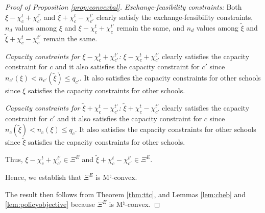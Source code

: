 \documentclass[12pt]{amsart}
\theoremstyle{remark}
\begin{document}
\begin{proof}[Proof of Proposition \ref{prop:convexbal}]
\smallskip
\noindent \emph{Exchange-feasibility constraints:} Both $\xi-\chi_c^t+\chi_{c'}^{t'}$ and $\tilde{\xi}+\chi_c^t-\chi_{c'}^{t'}$ clearly satisfy the exchange-feasibility constraints, $n_d$ values among $\xi$ and $\xi-\chi_c^t+\chi_{c}^{t'}$ remain the same, and $n_d$ values among $\tilde \xi$ and $\tilde{\xi}+\chi_c^t-\chi_{c}^{t'}$ remain the same.

\smallskip
\noindent \emph{Capacity constraints for $\xi-\chi_c^t+\chi_{c'}^{t'}$:} $\xi-\chi_c^t+\chi_{c'}^{t'}$ clearly satisfies the capacity constraint for $c$ and it also satisfies the capacity constraint for $c'$ since $n_{c'}(\xi) < n_{c'}(\tilde \xi) \leq q_{c'}$.  It also satisfies the capacity constraints for other schools since $\xi$ satisfies the capacity constraints for other schools.

\smallskip
\noindent \emph{Capacity constraints for $\tilde{\xi}+\chi_c^t-\chi_{c'}^{t'}$:} $\tilde{\xi}+\chi_c^t-\chi_{c'}^{t'}$ clearly satisfies the capacity constraint for $c'$
and it also satisfies the capacity constraint for $c$ since  $n_c(\tilde \xi) < n_c(\xi) \leq q_c$.  It also satisfies the capacity constraints for other schools since $\tilde \xi$ satisfies the capacity constraints for other schools.


Thus, $\xi-\chi_c^t+\chi_{c'}^{t'} \in \Xi^E$ and $\tilde{\xi}+\chi_c^t-\chi_{c'}^{t'}\in \Xi^E$.

Hence, we establish that $\Xi^E$ is M$^{\natural}$-convex.

The result then follows from Theorem \ref{thm:ttc}, and Lemmas \ref{lem:cheb} and \ref{lem:policyobjective} because $\Xi^E$ is M$^{\natural}$-convex.
\end{proof}
\medskip
\end{document}
